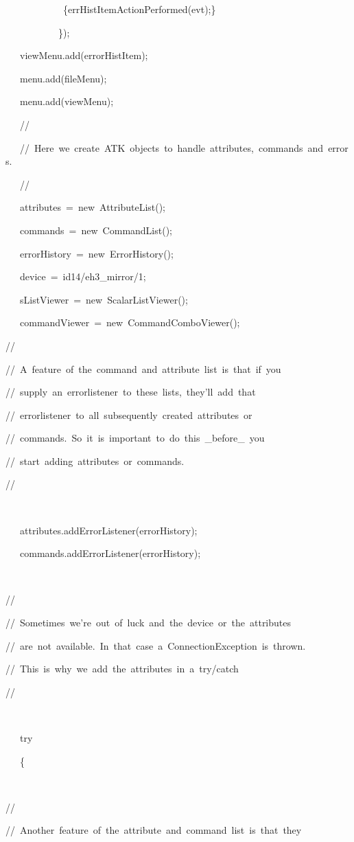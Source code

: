\begin{lyxcode}
~~~~~~~~~~~~\{errHistItemActionPerformed(evt);\}

~~~~~~~~~~~\});

~~~viewMenu.add(errorHistItem);

~~~menu.add(fileMenu);

~~~menu.add(viewMenu);

~~~//

~~~//~Here~we~create~ATK~objects~to~handle~attributes,~commands~and~errors.

~~~//

~~~attributes~=~new~AttributeList();~

~~~commands~=~new~CommandList();

~~~errorHistory~=~new~ErrorHistory();

~~~device~=~\textquotedbl{}id14/eh3\_mirror/1\textquotedbl{};

~~~sListViewer~=~new~ScalarListViewer();

~~~commandViewer~=~new~CommandComboViewer();

//~

//~A~feature~of~the~command~and~attribute~list~is~that~if~you

//~supply~an~errorlistener~to~these~lists,~they'll~add~that

//~errorlistener~to~all~subsequently~created~attributes~or

//~commands.~So~it~is~important~to~do~this~\_before\_~you

//~start~adding~attributes~or~commands.

//

~

~~~attributes.addErrorListener(errorHistory);

~~~commands.addErrorListener(errorHistory);

~

//

//~Sometimes~we're~out~of~luck~and~the~device~or~the~attributes

//~are~not~available.~In~that~case~a~ConnectionException~is~thrown.

//~This~is~why~we~add~the~attributes~in~a~try/catch

//

~

~~~try

~~~\{

~

//

//~Another~feature~of~the~attribute~and~command~list~is~that~they


\end{lyxcode}
